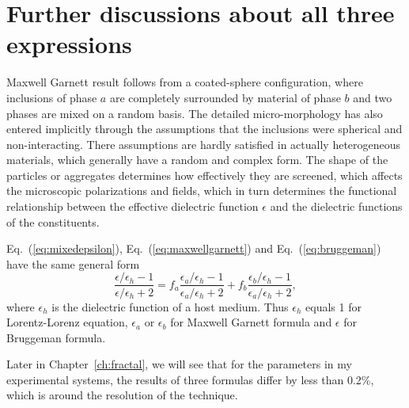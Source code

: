 \section{Further discussions about all three expressions}

Maxwell Garnett result follows from a coated-sphere configuration, where inclusions of phase $a$ are completely surrounded by material of phase $b$ and two phases are mixed on a random basis. The detailed micro-morphology has also entered implicitly through the assumptions that the inclusions were spherical and non-interacting. There assumptions are hardly satisfied in actually heterogeneous materials, which generally have a random and complex form. The shape of the particles or aggregates determines how effectively they are screened, which affects the microscopic polarizations and fields, which in turn determines the functional relationship between the effective dielectric function $\epsilon$ and the dielectric functions of the constituents.

Eq.~(\ref{eq:mixedepsilon}), Eq.~(\ref{eq:maxwellgarnett}) and Eq.~(\ref{eq:bruggeman}) have the same general form \cite{aspnes82}
\begin{equation}
\label{eq:general}
\frac{\epsilon/\epsilon_h - 1}{\epsilon/\epsilon_h + 2} = f_a \frac{\epsilon_a/\epsilon_h - 1}{\epsilon_a/\epsilon_h + 2} + f_b \frac{\epsilon_b/\epsilon_h - 1}{\epsilon_a/\epsilon_h + 2},
\end{equation}
where $\epsilon_h$ is the dielectric function of a host medium. Thus $\epsilon_h$ equals 1 for Lorentz-Lorenz equation, $\epsilon_a$ or $\epsilon_b$ for Maxwell Garnett formula and $\epsilon$ for Bruggeman formula.

Later in Chapter~\ref{ch:fractal}, we will see that for the parameters in my experimental systems, the results of three formulas differ by less than 0.2\%, which is around the resolution of the technique.